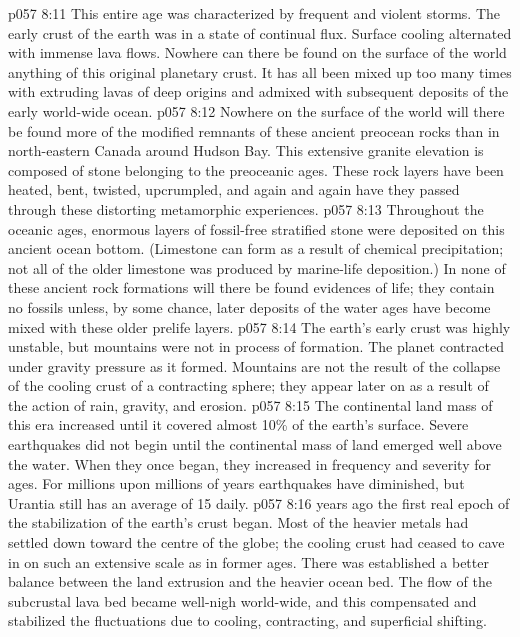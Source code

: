 \vs p057 8:11 \pc This entire age was characterized by frequent and violent storms. The early crust of the earth was in a state of continual flux. Surface cooling alternated with immense lava flows. Nowhere can there be found on the surface of the world anything of this original planetary crust. It has all been mixed up too many times with extruding lavas of deep origins and admixed with subsequent deposits of the early world\hyp{}wide ocean.
\vs p057 8:12 Nowhere on the surface of the world will there be found more of the modified remnants of these ancient preocean rocks than in north\hyp{}eastern Canada around Hudson Bay. This extensive granite elevation is composed of stone belonging to the preoceanic ages. These rock layers have been heated, bent, twisted, upcrumpled, and again and again have they passed through these distorting metamorphic experiences.
\vs p057 8:13 Throughout the oceanic ages, enormous layers of fossil\hyp{}free stratified stone were deposited on this ancient ocean bottom. (Limestone can form as a result of chemical precipitation; not all of the older limestone was produced by marine\hyp{}life deposition.) In none of these ancient rock formations will there be found evidences of life; they contain no fossils unless, by some chance, later deposits of the water ages have become mixed with these older prelife layers.
\vs p057 8:14 The earth’s early crust was highly unstable, but mountains were not in process of formation. The planet contracted under gravity pressure as it formed. Mountains are not the result of the collapse of the cooling crust of a contracting sphere; they appear later on as a result of the action of rain, gravity, and erosion.
\vs p057 8:15 The continental land mass of this era increased until it covered almost 10\% of the earth’s surface. Severe earthquakes did not begin until the continental mass of land emerged well above the water. When they once began, they increased in frequency and severity for ages. For millions upon millions of years earthquakes have diminished, but Urantia still has an average of 15 daily.
\vs p057 8:16 \pc {} years ago the first real epoch of the stabilization of the earth’s crust began. Most of the heavier metals had settled down toward the centre of the globe; the cooling crust had ceased to cave in on such an extensive scale as in former ages. There was established a better balance between the land extrusion and the heavier ocean bed. The flow of the subcrustal lava bed became well\hyp{}nigh world\hyp{}wide, and this compensated and stabilized the fluctuations due to cooling, contracting, and superficial shifting.
